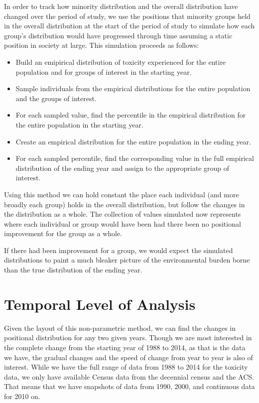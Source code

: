 \documentclass[12pt,twoside]{dukestatscithesis}
\theoremstyle{definition}
\theoremstyle{definition}
\theoremstyle{definition}
\theoremstyle{remark}
\begin{document}
In order to track how minority distribution and the overall distribution
have changed over the period of study, we use the positions that
minority groups held in the overall distribution at the start of the
period of study to simulate how each group's distribution would have
progressed through time assuming a static position in society at large.
This simulation proceeds as follows:
\begin{itemize}
\item
  Build an emipirical distribution of toxicity experienced for the
  entire population and for groups of interest in the starting year.
\item
  Sample individuals from the empirical distributions for the entire
  population and the groups of interest.
\item
  For each sampled value, find the percentile in the empirical
  distribution for the entire population in the starting year.
\item
  Create an empirical distribution for the entire population in the
  ending year.
\item
  For each sampled percentile, find the corresponding value in the full
  empirical distribution of the ending year and assign to the
  appropriate group of interest.
\end{itemize}
Using this method we can hold constant the place each individual (and
more broadly each group) holds in the overall distribution, but follow
the changes in the distribution as a whole. The collection of values
simulated now represents where each individual or group would have been
had there been no positional improvement for the group as a whole.

If there had been improvement for a group, we would expect the simulated
distributions to paint a much bleaker picture of the environmental
burden borne than the true distribution of the ending year.

\section{Temporal Level of Analysis}\label{temporal-level-of-analysis}

Given the layout of this non-parametric method, we can find the changes
in positional distribution for any two given years. Though we are most
interested in the complete change from the starting year of 1988 to
2014, as that is the data we have, the gradual changes and the speed of
change from year to year is also of interest. While we have the full
range of data from 1988 to 2014 for the toxicity data, we only have
available Census data from the decennial census and the ACS. That means
that we have snapshots of data from 1990, 2000, and continuous data for
2010 on.
\end{document}
